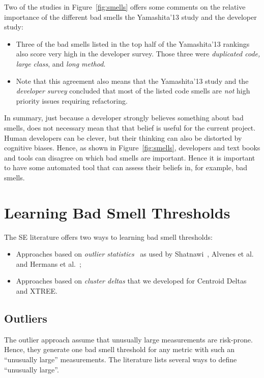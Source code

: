 \documentclass{sig-alternate}
\newcommand{\fig}[1]{Figure~\ref{fig:#1}}
\begin{document}
Two of the studies in \fig{smells} offers some comments on the relative importance
of the different bad smells the   Yamashita'13 study and the developer study:
    \begin{itemize}
        \item Three of the bad smells listed in the top half of the Yamashita'13 rankings also score very high in the developer survey. Those three were {\em duplicated code, large class}, 
        and {\em long method}.
        \item
 Note that this agreement also means that the
  Yamashita'13 study and the {\em developer survey}   concluded
        that most of the  listed code smells are {\em not} high priority issues
        requiring refactoring. 
 \end{itemize} 
In summary, just because a developer strongly believes something
about bad smells, does
not necessary mean that that belief is useful for the current project.
Human developers can be clever, but their thinking can also be distorted
by cognitive biases.
Hence, as shown in \fig{smells}, developers and text books and tools 
can disagree on which bad smells are important.
Hence it is important to have some automated tool
that can assess their beliefs in, for example,
bad smells.  
 

\section{Learning Bad Smell Thresholds}
The SE literature offers  two ways to 
learning bad smell thresholds:
\begin{itemize}
    \item Approaches based on {\em outlier statistics}~\cite{erni96,bender99}
    as used by Shatnawi~\cite{Shatnawi10}, Alvenes et al.~\cite{Alves2010}
    and Hermans et al.~\cite{hermans15};
    \item  Approaches based on {\em cluster deltas} that we developed
    for   Centroid Deltas~\cite{me12c} and XTREE.
\end{itemize}
\subsection{  Outliers}

The outlier approach assume that unusually large measurements are risk-prone.
Hence, they generate one bad smell threshold for any metric
with such an ``unusually large'' measurements. 
The literature lists several ways to define ``unusually large''.
\end{document}
